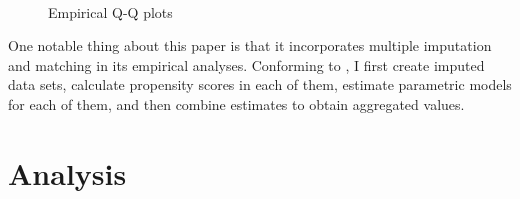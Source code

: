\documentclass[a4paper, 12pt]{article}\usepackage[dvipdfmx]{graphicx}\usepackage[]{xcolor}
\begin{document}
\begin{figure}[h]
\centering
  \hfill
   \\
  \caption{Empirical Q-Q plots}
  \label{qq}
\end{figure}

One notable thing about this paper is that it incorporates multiple imputation and matching in its empirical analyses. Conforming to \citet{leyrat2019propensity}, I first create imputed data sets, calculate propensity scores in each of them, estimate parametric models for each of them, and then combine estimates to obtain aggregated values. 

\section{Analysis} \label{ch5}
\end{document}
